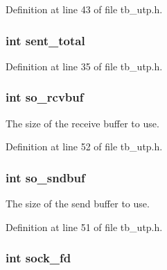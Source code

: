 Definition at line 43 of file tb\-\_\-utp.\-h.

\hypertarget{structtb__utp__t_a8cb5bfce3dd82afd8155aae9c7328441}{
\subsubsection[{sent\-\_\-total}]{\setlength{\rightskip}{0pt plus 5cm}int sent\-\_\-total}}\label{structtb__utp__t_a8cb5bfce3dd82afd8155aae9c7328441}


Definition at line 35 of file tb\-\_\-utp.\-h.

\hypertarget{structtb__utp__t_a739481faef9852a57d912b2a31b5a8fc}{
\subsubsection[{so\-\_\-rcvbuf}]{\setlength{\rightskip}{0pt plus 5cm}int so\-\_\-rcvbuf}}\label{structtb__utp__t_a739481faef9852a57d912b2a31b5a8fc}


The size of the receive buffer to use. 



Definition at line 52 of file tb\-\_\-utp.\-h.

\hypertarget{structtb__utp__t_aae962af134e15f29f1dd0b005fc3ff2c}{
\subsubsection[{so\-\_\-sndbuf}]{\setlength{\rightskip}{0pt plus 5cm}int so\-\_\-sndbuf}}\label{structtb__utp__t_aae962af134e15f29f1dd0b005fc3ff2c}


The size of the send buffer to use. 



Definition at line 51 of file tb\-\_\-utp.\-h.

\hypertarget{structtb__utp__t_a514331e6141a28289f8ddead55eadebd}{
\subsubsection[{sock\-\_\-fd}]{\setlength{\rightskip}{0pt plus 5cm}int sock\-\_\-fd}}\label{structtb__utp__t_a514331e6141a28289f8ddead55eadebd}


